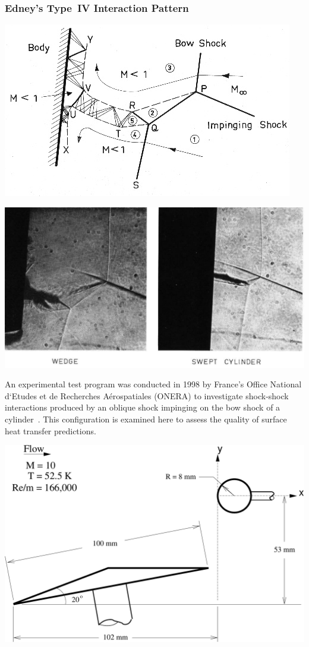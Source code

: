 \documentclass[compress,11pt]{beamer}
\begin{document}
\frame
{
  \frametitle{\scriptsize Edney's Type~IV Interaction Pattern~\cite{edney-ssi}}
  \vspace{-1.5em}
  \begin{center}
    \includegraphics[width=.65\textwidth]{figures/edney/type4_schem}
    
    \includegraphics[width=.48\textwidth]{figures/edney/type4}
  \end{center}
}

\frame
{
  \scriptsize
 An experimental test program was conducted in 1998 by France's Office National d`Etudes et de Recherches A\'{e}rospatiales (ONERA) to investigate shock-shock interactions produced by an oblique shock impinging on the bow shock of a cylinder~\cite{onera-hypersonic-ssi}.  This configuration is examined here to assess the quality of surface heat transfer predictions.

 \begin{center}
    \includegraphics[width=.7\textwidth]{figures/onera_type4_ssi/schematic}
  \end{center}
}
\end{document}
